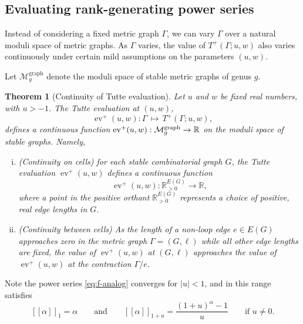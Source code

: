 \documentclass{amsart}
\newtheorem{thm}{Theorem}
\theoremstyle{definition}
\newcommand{\RR}{\mathbb{R}}
\newcommand{\RRpos}{\RR_{>0}}
\DeclareMathOperator{\ev}{ev}
\newcommand{\fanalog}[2]{[\![#2]\!]_{#1}}
\newcommand{\Mgraphg}{\mathcal M_g^{\mathrm{graph}}}
\begin{document}
\subsection{Evaluating rank-generating power series}

Instead of considering a fixed metric graph $\Gamma$,
we can 
vary $\Gamma$ over a natural moduli space of metric graphs.
As $\Gamma$ varies, the value of $T^+(\Gamma;u,w)$ also varies continuously under certain mild assumptions on the parameters $(u, w)$.

Let $\Mgraphg$ denote the moduli space of stable metric graphs of genus $g$.
\begin{thm}[Continuity of Tutte evaluation]
\label{thm:tutte-eval-moduli}
	Let $u$ and $w$ be fixed real numbers, with $u > -1$.
	The Tutte evaluation at $(u,w)$,
	\[ \ev^+(u,w) : \Gamma \,\mapsto\, T^+(\Gamma; u,w) ,\]
	defines a continuous function  
	${\rm ev}^+(u,w) : \Mgraphg \to \RR$ on the moduli space of stable graphs.
	Namely, 
	\begin{enumerate}[(i)]
	\item 
	(Continuity on cells)
	for each stable combinatorial graph $G$,
	the Tutte evaluation 
	$\ev^+(u,w) $ 
	defines a continuous function
	\[
		\ev^+(u,w) : \RRpos^{E(G)} \to \RR,
	\]
	where a point in the positive orthant $\RRpos^{E(G)}$
	represents a choice of positive, real edge lengths in $G$.
	
	\item 
	(Continuity between cells)
	As the length of a non-loop edge $e \in E(G)$ approaches zero in the metric graph $\Gamma = (G,\ell)$
	while all other edge lengths are fixed, the value of 
	$\ev^+(u,w)$
	at $(G, \ell)$ %
	approaches the value of $\ev^+(u,w)$ at the contraction 
	$\Gamma / e$. %
	\end{enumerate}
\end{thm}

Note the power series \eqref{eq:f-analog} converges for $|u| < 1$, and in this range satisfies
\[ 
	\fanalog{1}{\alpha} = \alpha
	\qquad\text{and}\qquad
	\fanalog{1 + u}{\alpha} = \frac{(1+u)^\alpha - 1}{u}
	\qquad \text{if } u \neq 0.
\]
\end{document}
